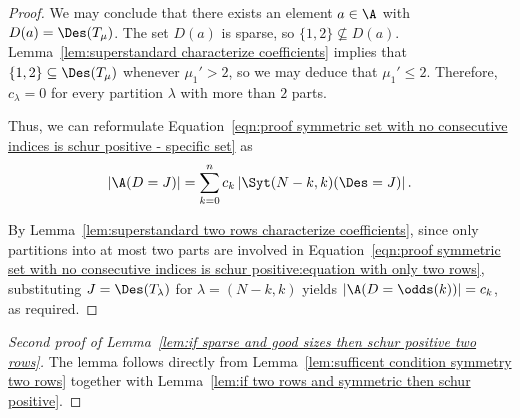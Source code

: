 \begin{proof}
    We may conclude that there exists an element $a \in \A$ with $D(a) = \Des(T_\mu)$. The set $D(a)$ is sparse, so $\{1,2\} \nsubseteq D(a)$. Lemma~\ref{lem:superstandard characterize coefficients} implies that $\{1,2\} \subseteq \Des(T_\mu)$ whenever $\mu_1' >2$, so we may deduce that $\mu_1' \le 2$. Therefore, $c_\lambda = 0$ for every partition $\lambda$ with more than $2$ parts.
    
    Thus, we can reformulate Equation~\eqref{eqn:proof symmetric set with no consecutive indices is schur positive - specific set} as
    \begin{equation}\label{eqn:proof symmetric set with no consecutive indices is schur positive:equation with only two rows}
        |\A(D = J)| = \sum_{k=0}^n c_k \left|\Syt(N-k,k)(\Des = J)\right|.
    \end{equation}
    
    By Lemma~\ref{lem:superstandard two rows characterize coefficients}, since only partitions into at most two parts are involved in Equation~\eqref{eqn:proof symmetric set with no consecutive indices is schur positive:equation with only two rows}, substituting $J = \Des(T_{\lambda})$ for $\lambda = (N-k,k)$ yields $|\A(D = \odds(k))| = c_k$, as required.
\end{proof}

\begin{proof}[Second proof of Lemma~\ref{lem:if sparse and good sizes then schur positive two rows}]
    The lemma follows directly from Lemma~\ref{lem:sufficent condition symmetry two rows} together with Lemma~\ref{lem:if two rows and symmetric then schur positive}.
\end{proof}

